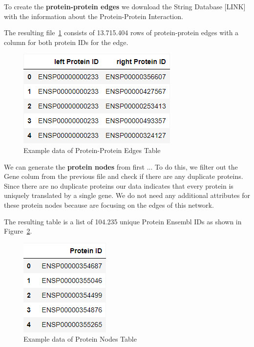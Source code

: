 To create the \textbf{protein-protein edges} we download the String Database [LINK] with the information about the Protein-Protein Interaction.

The resulting file~\ref{fig:03_02_df_protein_edges} consists of 13.715.404 rows of protein-protein edges with a column for both protein IDs for the edge.
\begin{figure}[h]
    \centering
    \includegraphics[height=\dfheight]{figures/03_02_protein_edges}
    \caption{Example data of Protein-Protein Edges Table}
    \label{fig:03_02_df_protein_edges}
\end{figure}


We can generate the \textbf{protein nodes} from first ...
To do this, we filter out the Gene colum from the previous file and check if there are any duplicate proteins.
Since there are no duplicate proteins our data indicates that every protein is uniquely translated by a single gene.
We do not need any additional attributes for these protein nodes because are focusing on the edges of this network.

The resulting table is a list of 104.235 unique Protein Ensembl IDs as shown in Figure~\ref{fig:03_02_df_protein_nodes}.
\begin{figure}[h]
    \centering
    \includegraphics[height=\dfheight]{figures/03_02_protein_nodes}
    \caption{Example data of Protein Nodes Table}
    \label{fig:03_02_df_protein_nodes}
\end{figure}

